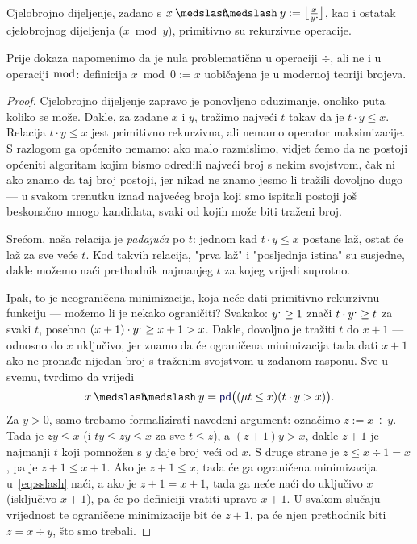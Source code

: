 \begin{propozicija}[{name=[primitivna rekurzivnost dijeljenja s ostatkom]}]\label{prop:divmodprn}
    Cjelobrojno dijeljenje, zadano s $x\div y:=\bigl\lfloor\frac{x}{y\bump\!}\bigr\rfloor$, kao i ostatak cjelobrojnog dijeljenja ($x\bmod y$), primitivno su rekurzivne operacije.
\end{propozicija}
Prije dokaza napomenimo da je nula problematična u operaciji $\div$, ali ne i u operaciji $\bmod$: definicija $x\bmod 0:=x$ uobičajena je u modernoj teoriji brojeva.
\begin{proof}
Cjelobrojno dijeljenje zapravo je ponovljeno oduzimanje, onoliko puta koliko se može. Dakle, za zadane $x$ i $y$, tražimo najveći $t$ takav da je $t\cdot y\le x$. Relacija $t\cdot y\le x$ jest primitivno rekurzivna, ali nemamo operator maksimizacije. S razlogom ga općenito nemamo: ako malo razmislimo, vidjet ćemo da ne postoji općeniti algoritam kojim bismo odredili najveći broj s nekim svojstvom, čak ni ako znamo da taj broj postoji, jer nikad ne znamo jesmo li tražili dovoljno dugo --- u svakom trenutku iznad najvećeg broja koji smo ispitali postoji još beskonačno mnogo kandidata, svaki od kojih može biti traženi broj.

Srećom, naša relacija je \emph{padajuća} po $t$: jednom kad $t\cdot y\le x$ postane laž, ostat će laž za sve veće $t$. Kod takvih relacija, "prva laž" i "posljednja istina" su susjedne, dakle možemo naći prethodnik najmanjeg $t$ za kojeg vrijedi suprotno.

Ipak, to je neograničena minimizacija, koja neće dati primitivno rekurzivnu funkciju --- možemo li je nekako ograničiti? Svakako: $y\sp{\text{\normalsize.}}\ge 1$ znači $t\cdot y\sp{\text{\normalsize.}}\ge t$ za svaki $t$, posebno $(x+1)\cdot y\sp{\text{\normalsize.}}\ge x+1>x$. Dakle, dovoljno je tražiti $t$ do $x+1$ --- odnosno do $x$ uključivo, jer znamo da će ograničena minimizacija tada dati $x+1$ ako ne pronađe nijedan broj s traženim svojstvom u zadanom rasponu. Sve u svemu, tvrdimo da vrijedi
\begin{equation}\label{eq:sslash}
    x\div y=\f{pd}\bigl((\mu t\le x)(t\cdot y>x)\bigr)\text.
\end{equation}
Za $y>0$, samo trebamo formalizirati navedeni argument: označimo $z:=x\div y$. Tada je $zy\le x$ (i $ty\le zy\le x$ za sve $t\le z$), a $(z+1)y>x$, dakle $z+1$ je najmanji $t$ koji pomnožen s $y$ daje broj veći od $x$. S druge strane je $z\le x\div1=x$, pa je $z+1\le x+1$. Ako je $z+1\le x$, tada će ga ograničena minimizacija u~\eqref{eq:sslash} naći, a ako je $z+1=x+1$, tada ga neće naći do uključivo $x$ (isključivo $x+1$), pa će po definiciji vratiti upravo $x+1$. U svakom slučaju vrijednost te ograničene minimizacije bit će $z+1$, pa će njen prethodnik biti $z=x\div y$, što smo trebali.


\end{proof}
